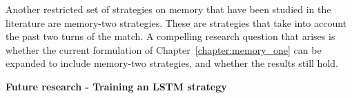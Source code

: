 Another restricted set of strategies on memory that have been studied in the literature
are memory-two strategies. These are strategies that take into account the past
two turns of the match. A compelling research question that arises is whether
the current formulation of Chapter~\ref{chapter:memory_one} can be expanded to
include memory-two strategies, and whether the results still hold.

\textbf{Future research - Training an LSTM strategy}

